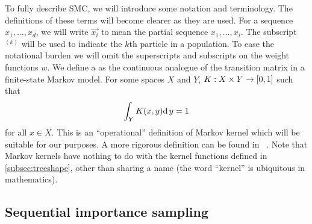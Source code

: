 To fully describe \gls{SMC}, we will introduce some notation and terminology.
The definitions of these terms will become clearer as they are used. For a
sequence $x_1, \ldots, x_d$, we will write $\vec{x_i}$ to mean the partial
sequence $x_1, \ldots, x_i$. The subscript $^{(k)}$ will be used to indicate
the $k$th particle in a population. To ease the notational burden we will omit
the superscripts and subscripts on the weight functions $w$. We define a
 as the continuous analogue of the transition matrix in a
finite-state Markov model. For some spaces $X$ and $Y$, $K : X \times Y
\to [0, 1]$ such that
\begin{align}
    \label{eq:mk}
    \int_Y K(x, y) \mathrm{d}\, y = 1
\end{align}
for all $x \in X$. This is an ``operational'' definition of Markov kernel which
will be suitable for our purposes. A more rigorous definition can be found in
\eg~\autocite{kallenberg2006foundations}. Note that Markov kernels have nothing
to do with the kernel functions defined in \cref{subsec:treeshape}, other than
sharing a name (the word ``kernel'' is ubiquitous in mathematics). 

\subsection{Sequential importance sampling}
\label{subsec:sis}

